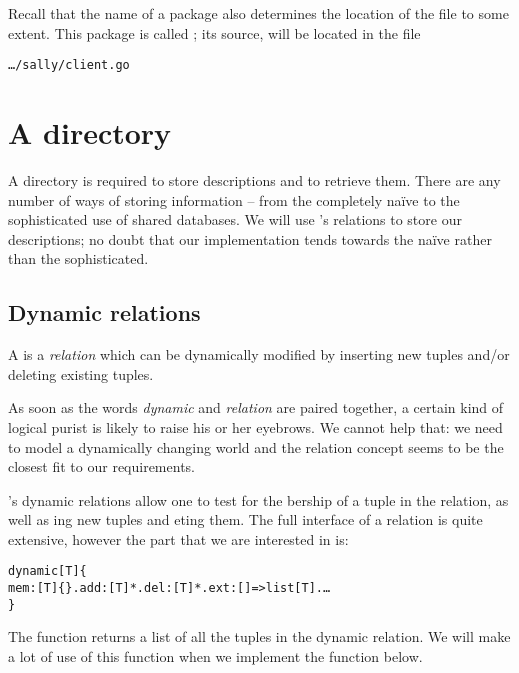 \begin{aside}
Recall that the name of a package also determines the location of the file to some extent. This package is called ; its source, will be located in the file
\begin{alltt}
\ldots/sally/client.go
\end{alltt}
\end{aside}

\section{A  directory}
A directory is required to store descriptions and to retrieve them. There are any number of ways of storing information -- from the completely na\"ive to the sophisticated use of shared databases. We will use \go's  relations to store our descriptions; no doubt that our implementation tends towards the na\"ive rather than the sophisticated.

\subsection{Dynamic relations}
\label{directory:dynamic}
A  is a \emph{relation} which can be dynamically modified by inserting new tuples and/or deleting existing tuples.

\begin{aside}
As soon as the words \emph{dynamic} and \emph{relation} are paired together, a certain kind of logical purist is likely to raise his or her eyebrows. We cannot help that: we need to model a dynamically changing world and the relation concept seems to be the closest fit to our requirements.
\end{aside}

\noindent
\go's dynamic relations allow one to test for the bership of a tuple in the relation, as well as ing new tuples and eting them. The full interface of a  relation is quite extensive, however the part that we are interested in is:
\begin{alltt}
dynamic[T] \typearrow{} \{
  mem:[T]\{\}. add:[T]*. del:[T]*. ext:[]=>list[T]. \ldots
\}
\end{alltt}
The  function returns a list of all the tuples in the dynamic relation. We will make a lot of use of this function when we implement the  function below.

